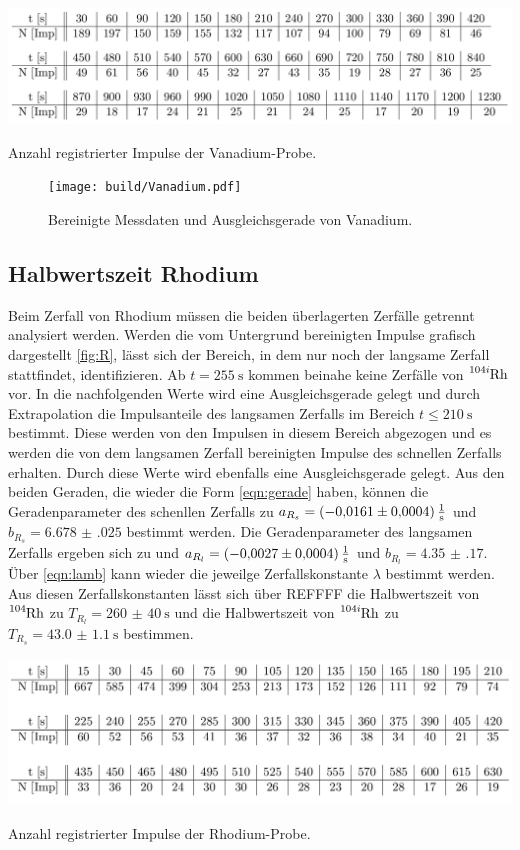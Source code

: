 \begin{table}
\centering
\includegraphics[width=\textwidth]{data/Vanadium.png}
\caption{Anzahl registrierter Impulse der Vanadium-Probe.}
\label{tab:V}
\end{table}

\begin{figure}
\centering
\texttt{[image: build/Vanadium.pdf]}
\caption{Bereinigte Messdaten und Ausgleichsgerade von Vanadium.}
\end{figure}

\subsection{Halbwertszeit Rhodium}
Beim Zerfall von Rhodium müssen die beiden überlagerten Zerfälle getrennt analysiert werden. Werden die vom Untergrund bereinigten Impulse grafisch dargestellt \ref{fig:R}, lässt sich der Bereich, in dem nur noch der langsame Zerfall stattfindet, identifizieren. Ab $t=\SI{255}{\s}$ kommen beinahe keine Zerfälle von $\ce{^{104i}Rh}$ vor. In die nachfolgenden Werte wird eine Ausgleichsgerade gelegt und durch Extrapolation die Impulsanteile des langsamen Zerfalls im Bereich $t\leq\SI{210}{\s}$ bestimmt. Diese werden von den Impulsen in diesem Bereich abgezogen und es werden die von dem langsamen Zerfall bereinigten Impulse des schnellen Zerfalls erhalten. Durch diese Werte wird ebenfalls eine Ausgleichsgerade gelegt. Aus den beiden Geraden, die wieder die Form \eqref{eqn:gerade} haben, können die Geradenparameter des schenllen Zerfalls zu $a_{R_s}=\SI{-0.0161(0004)}{\frac{1}{\s}}$ und $b_{R_s}=\num{6.678(025)}$ bestimmt werden. Die Geradenparameter des langsamen Zerfalls ergeben sich zu und $a_{R_l}=\SI{-0.0027(0004)}{\frac{1}{\s}}$ und $b_{R_l}=\num{4.35(17)}$. Über \eqref{eqn:lamb} kann wieder die jeweilge Zerfallskonstante $\lambda$ bestimmt werden. Aus diesen Zerfallskonstanten lässt sich über REFFFF die Halbwertszeit von $\ce{^{104}Rh}$ zu $T_{R_l}=\SI{260(40)}{\s}$ und die Halbwertszeit von $\ce{^{104i}Rh}$ zu $T_{R_s}=\SI{43.0(11)}{\s}$ bestimmen.



\begin{table}
\centering
\includegraphics[width=\textwidth]{data/Rhodium.png}
\caption{Anzahl registrierter Impulse der Rhodium-Probe.}
\label{tab:R}
\end{table}

